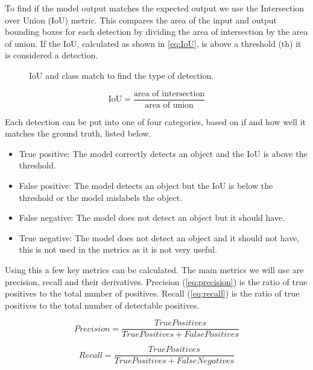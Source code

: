 To find if the model output matches the expected output we use the Intersection over Union (IoU) metric. This compares the area of the input and output bounding boxes for each detection by dividing the area of intersection by the area of union. If the IoU, calculated as shown in \ref{eq:IoU}, is above a threshold (th) it is considered a detection.

\begin{figure}[h]
	\centering
	
	\caption{\label{fig:2_IoU_det} IoU and class match to find the type of detection.}
\end{figure}

\begin{equation}
	\text{IoU} = \frac{\text{area of intersection}}{\text{area of union}}
	\label{eq:IoU}
\end{equation}

Each detection can be put into one of four categories, based on if and how well it matches the ground truth, listed below.

\begin{itemize}
	\item True positive: The model correctly detects an object and the IoU is above the threshold.
	\item False positive: The model detects an object but the IoU is below the threshold or the model mislabels the object.
	\item False negative: The model does not detect an object but it should have.
	\item True negative: The model does not detect an object and it should not have, this is not used in the metrics as it is not very useful.
\end{itemize}

Using this a few key metrics can be calculated. The main metrics we will use are precision, recall and their derivatives. Precision (\ref{eq:precision}) is the ratio of true positives to the total number of positives. Recall (\ref{eq:recall}) is the ratio of true positives to the total number of detectable positives.



\begin{equation}
	Precision = \frac{TruePositives}{True Positives + False Positives}
	\label{eq:precision}
\end{equation}

\begin{equation}
	Recall = \frac{True Positives}{True Positives + False Negatives}
	\label{eq:recall}
\end{equation}

